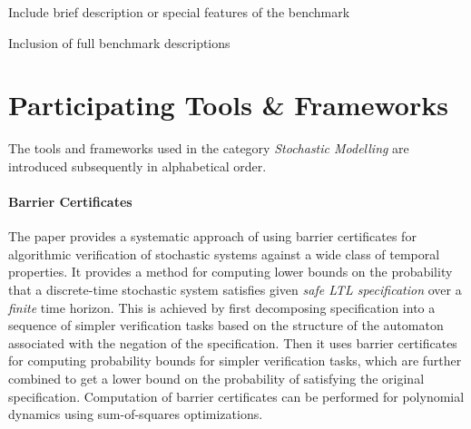 \documentclass[EPiC]{easychair}
\newcommand{\todo}[1]{
  \begin{framed}
    \noindent{\bf TODO: }
    #1
  \end{framed}
}
\begin{document}
\todo{Include brief description or special features of the benchmark}


\newpage


\newpage


\newpage


\newpage



\todo{Inclusion of full benchmark descriptions}

\section{Participating Tools \& Frameworks}
\label{sect:tools}

The tools and frameworks used in the category \textit{Stochastic Modelling} are introduced subsequently in alphabetical order.

\paragraph{Barrier Certificates}
The paper \cite{} provides a systematic approach of using barrier certificates for algorithmic verification of stochastic systems against a wide class of temporal properties. It provides a method for computing lower bounds on the probability that a discrete-time stochastic system satisfies given \emph{safe LTL specification} over a \emph{finite} time horizon. This is achieved by first decomposing specification into a sequence of simpler verification tasks based on the structure of the automaton associated with the negation of the specification. Then it uses barrier certificates for computing probability bounds for simpler verification tasks, which are further combined to get a lower bound on the probability of satisfying the original specification. Computation of barrier certificates can be performed for polynomial dynamics using sum-of-squares optimizations. 
\end{document}

